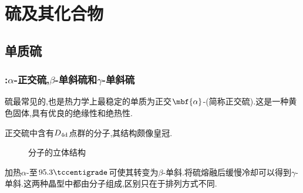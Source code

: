 \documentclass{ctexart}
\begin{document}
\section{硫及其化合物}
\subsection{单质硫}
\subsubsection{:$\alpha$-正交硫,$\beta$-单斜硫和$\gamma$-单斜硫}
\begin{substance}
    硫最常见的,也是热力学上最稳定的单质为正交$\mbf{\alpha}$-(简称正交硫).这是一种黄色固体,具有优良的绝缘性和绝热性.
\end{substance}
正交硫中含有$D_{4\text d}$点群的分子,其结构颇像皇冠.
\begin{figure}[H]
    \centering
    \caption{分子的立体结构}
\end{figure}
加热$\alpha$-至$95.3\tccentigrade$可使其转变为$\beta$-单斜.将硫熔融后缓慢冷却可以得到$\gamma$-单斜.这两种晶型中都由分子组成,区别只在于排列方式不同.
\end{document}
